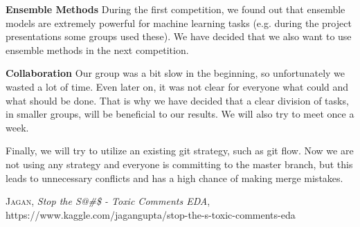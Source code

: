 \documentclass[10pt, a4paper,twocolumn]{article}
\begin{document}
	\textbf{Ensemble Methods} During the first competition, we found out that ensemble models are extremely powerful for machine learning tasks (e.g. during the project presentations some groups used these). We have decided that we also want to use ensemble methods in the next competition.
	
	\textbf{Collaboration} Our group was a bit slow in the beginning, so unfortunately we wasted a lot of time. Even later on, it was not clear for everyone what could and what should be done. That is why we have decided that a clear division of tasks, in smaller groups, will be beneficial to our results. We will also try to meet once a week.
	
	Finally, we will try to utilize an existing git strategy, such as git flow. Now we are not using any strategy and everyone is committing to the master branch, but this leads to unnecessary conflicts and has a high chance of making merge mistakes.
	\begin{thebibliography}{xx}
		\textsc{Jagan}, \textit{Stop the S@\#\$ - Toxic Comments EDA},
		 https://www.kaggle.com/jagangupta/stop-the-s-toxic-comments-eda
	\end{thebibliography}
	
\end{document}
